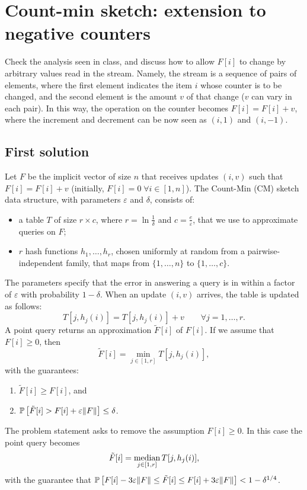 \section{Count-min sketch: extension to negative counters}

Check the analysis seen in class, and discuss how to allow $F[i]$ to change by arbitrary
values read in the stream.
Namely, the stream is a sequence of pairs of elements, where the first element indicates the
item $i$ whose counter is to be changed, and the second element is the amount $v$ of that
change ($v$ can vary in each pair).
In this way, the operation on the counter becomes $F[i] = F[i] + v$, where the increment
and decrement can be now seen as $(i, 1)$ and $(i, -1)$.


\subsection{First solution}

Let $F$ be the implicit vector of size $n$ that receives updates $(i, v)$ such that $F[i]=F[i]+v$ (initially, $F[i]=0 \; \forall i \in [1, n]$).
The Count-Min (CM) sketch data structure, with parameters $\varepsilon$ and $\delta$, consists of:
\begin{itemize}
  \item a table $T$ of size $r\times c$, where $r=\ln\frac{1}{\delta}$ and $c=\frac{e}{\varepsilon}$, that we use to approximate queries on $F$;
  \item $r$ hash functions $h_1, \dots, h_r$, chosen uniformly at random from a pairwise-independent family, that maps from $\{1,\dots,n\}$ to $\{1,\dots,c\}$.
\end{itemize}
The parameters specify that the error in answering a query is in within a factor of $\varepsilon$ with probability $1-\delta$.
When an update $(i, v)$ arrives, the table is updated as follows: 
$$ T[j, h_j(i)] = T[j, h_j(i)] + v \qquad \forall j = 1, \dots, r. $$ 
A point query returns an approximation $\tilde{F}[i]$ of $F[i]$. If we assume that $F[i] \geq 0$, then
$$\tilde{F}[i]=\min_{j\in[1,r]} T[j, h_j(i)],$$ with the guarantees:
\begin{enumerate}
  \item $\tilde{F}[i]\geq F[i]$, and
  \item $\operatorname*{\mathbb{P}}\left[{\tilde{F}[i]>F[i]+\varepsilon\lVert F\rVert}\right]\le\delta$.
\end{enumerate}

The problem statement asks to remove the assumption $F[i]\geq 0$. In this case the point query becomes 
$$\tilde{F}[i]=\operatorname*{median}_{j\in[1,r]} T[j, h_j(i)],$$
with the guarantee that $\operatorname*{\mathbb{P}}\left[{F[i]-3\varepsilon\lVert F\rVert \leq \tilde{F}[i] \leq F[i]+3\varepsilon\lVert F\rVert}\right] < 1-\delta^{1/4}$.

